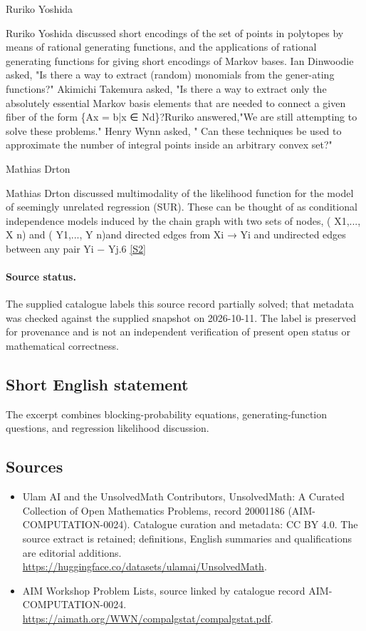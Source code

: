 \documentclass[11pt]{article}
\newcommand{\sref}[2]{\hyperlink{source:#1:#2}{[S#2]}}
\begin{document}
Ruriko Yoshida

Ruriko Yoshida discussed short encodings of the set of points in polytopes by means of rational generating functions, and the applications of rational generating functions for giving short encodings of Markov bases. Ian Dinwoodie asked, "Is there a way to extract (random) monomials from the gener-ating functions?" Akimichi Takemura asked, "Is there a way to extract only the absolutely essential Markov basis elements that are needed to connect a given fiber of the form \{Ax = b|x ∈ Nd\}?Ruriko answered,"We are still attempting to solve these problems." Henry Wynn asked, " Can these techniques be used to approximate the number of integral points inside an arbitrary convex set?"

Mathias Drton

Mathias Drton discussed multimodality of the likelihood function for the model of seemingly unrelated regression (SUR). These can be thought of as conditional independence models induced by the chain graph with two sets of nodes, ( X1,..., X n) and ( Y1,..., Y n)and directed edges from Xi → Yi and undirected edges between any pair Yi − Yj.6 \sref{20001186}{2}
\paragraph{Source status.}
The supplied catalogue labels this source record partially solved; that metadata was checked against the supplied snapshot on 2026-10-11. The label is preserved for provenance and is not an independent verification of present open status or mathematical correctness.
\subsection{Short English statement}
The excerpt combines blocking-probability equations, generating-function questions, and regression likelihood discussion.
\subsection{Sources}
\begin{itemize}
\item[\hypertarget{source:20001186:1}{S1}] Ulam AI and the UnsolvedMath Contributors, UnsolvedMath: A Curated Collection of Open Mathematics Problems, record 20001186 (AIM-COMPUTATION-0024). Catalogue curation and metadata: CC BY 4.0. The source extract is retained; definitions, English summaries and qualifications are editorial additions.
\url{https://huggingface.co/datasets/ulamai/UnsolvedMath}.
\item[\hypertarget{source:20001186:2}{S2}] AIM Workshop Problem Lists, source linked by catalogue record AIM-COMPUTATION-0024.
\url{https://aimath.org/WWN/compalgstat/compalgstat.pdf}.
\end{itemize}
\end{document}
